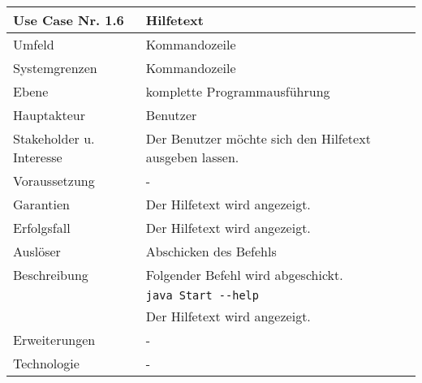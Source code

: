 \begin{tabular}{| l | l |}
 \hline
 \textbf{Use Case Nr. 1.6} & Hilfetext\\
 \hline
 Umfeld & Kommandozeile\\
 \hline
 Systemgrenzen & Kommandozeile\\
 \hline
 Ebene & komplette Programmausführung\\
 \hline
 Hauptakteur & Benutzer\\
 \hline
 Stakeholder u. Interesse & Der Benutzer möchte sich den Hilfetext ausgeben lassen.\\
 \hline
 Voraussetzung & -\\
 \hline
 Garantien & Der Hilfetext wird angezeigt.\\
 \hline
 Erfolgsfall & Der Hilfetext wird angezeigt.\\
 \hline
 Auslöser & Abschicken des Befehls\\
 \hline
 Beschreibung & Folgender Befehl wird abgeschickt.\\
	      & \verb|java Start --help|\\
	      & Der Hilfetext wird angezeigt.\\
 \hline
 Erweiterungen & -\\
 \hline
 Technologie & -\\
 \hline
\end{tabular}


